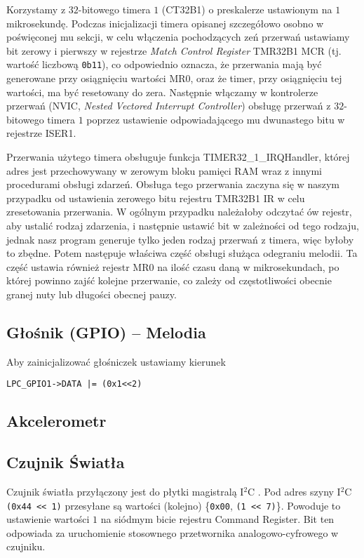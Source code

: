 \documentclass[a4paper,12pt,twoside]{article}
\theoremstyle{plain}
\theoremstyle{definition}
\theoremstyle{remark}
\begin{document}
Korzystamy z $32$-bitowego timera $1$ (CT32B1) o preskalerze ustawionym na $1$ mikrosekundę. Podczas inicjalizacji timera opisanej szczegółowo osobno w poświęconej mu sekcji, w celu włączenia pochodzących zeń przerwań ustawiamy bit zerowy i pierwszy w rejestrze \textit{Match Control Register} TMR32B1 MCR (tj. wartość liczbową \verb|0b11|), co odpowiednio oznacza, że przerwania mają być generowane przy osiągnięciu wartości MR0, oraz że timer, przy osiągnięciu tej wartości, ma być resetowany do zera. Następnie włączamy w kontrolerze przerwań (NVIC, \textit{Nested Vectored Interrupt Controller}) obsługę przerwań z $32$-bitowego timera $1$ poprzez ustawienie odpowiadającego mu dwunastego bitu w rejestrze ISER1.

Przerwania użytego timera obsługuje funkcja \mbox{TIMER32\_1\_IRQHandler}, której adres jest przechowywany w zerowym bloku pamięci RAM wraz z innymi procedurami obsługi zdarzeń. Obsługa tego przerwania zaczyna się w naszym przypadku od ustawienia zerowego bitu rejestru TMR32B1 IR w celu zresetowania przerwania. W ogólnym przypadku należałoby odczytać ów rejestr, aby ustalić rodzaj zdarzenia, i następnie ustawić bit w zależności od tego rodzaju, jednak nasz program generuje tylko jeden rodzaj przerwań z timera, więc byłoby to zbędne. Potem następuje właściwa część obsługi służąca odegraniu melodii. Ta część ustawia również rejestr MR0 na ilość czasu daną w mikrosekundach, po której powinno zajść kolejne przerwanie, co zależy od częstotliwości obecnie granej nuty lub długości obecnej pauzy.

\subsection{Głośnik (GPIO) -- Melodia}
Aby zainicjalizować głośniczek ustawiamy kierunek 
\begin{verbatim}
LPC_GPIO1->DATA |= (0x1<<2)
\end{verbatim}

\subsection{Akcelerometr}

\subsection{Czujnik \'Swiatła}
Czujnik światła przyłączony jest do płytki magistralą I$^2$C \cite{LUX}. Pod adres szyny I$^2$C \verb|(0x44 << 1)| przesyłane są wartości (kolejno) \{\verb|0x00|, \verb|(1 << 7)|\}. Powoduje to ustawienie wartości $1$ na siódmym bicie rejestru Command Register. Bit ten odpowiada za uruchomienie stosownego przetwornika analogowo-cyfrowego w czujniku.
\end{document}
